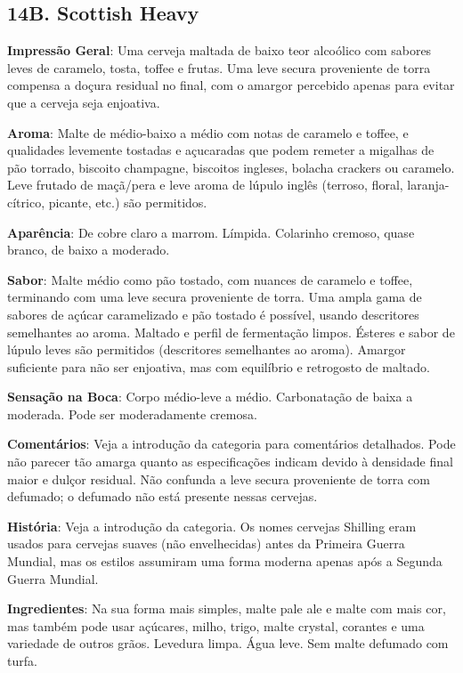 \subsection*{14B. Scottish Heavy}
\textbf{Impressão Geral}: Uma cerveja maltada de baixo teor alcoólico com sabores leves de caramelo, tosta, toffee e frutas. Uma leve secura proveniente de torra compensa a doçura residual no final, com o amargor percebido apenas para evitar que a cerveja seja enjoativa.

\textbf{Aroma}: Malte de médio-baixo a médio com notas de caramelo e toffee, e qualidades levemente tostadas e açucaradas que podem remeter a migalhas de pão torrado, biscoito champagne, biscoitos ingleses, bolacha crackers ou caramelo. Leve frutado de maçã/pera e leve aroma de lúpulo inglês (terroso, floral, laranja-cítrico, picante, etc.) são permitidos.

\textbf{Aparência}: De cobre claro a marrom. Límpida. Colarinho cremoso, quase branco, de baixo a moderado.

\textbf{Sabor}: Malte médio como pão tostado, com nuances de caramelo e toffee, terminando com uma leve secura proveniente de torra. Uma ampla gama de sabores de açúcar caramelizado e pão tostado é possível, usando descritores semelhantes ao aroma. Maltado e perfil de fermentação limpos. Ésteres e sabor de lúpulo leves são permitidos (descritores semelhantes ao aroma). Amargor suficiente para não ser enjoativa, mas com equilíbrio e retrogosto de maltado.

\textbf{Sensação na Boca}: Corpo médio-leve a médio. Carbonatação de baixa a moderada. Pode ser moderadamente cremosa.

\textbf{Comentários}: Veja a introdução da categoria para comentários detalhados. Pode não parecer tão amarga quanto as especificações indicam devido à densidade final maior e dulçor residual. Não confunda  a leve secura proveniente de torra com defumado; o defumado não está presente nessas cervejas.

\textbf{História}: Veja a introdução da categoria. Os nomes cervejas Shilling eram usados para cervejas suaves (não envelhecidas) antes da Primeira Guerra Mundial, mas os estilos assumiram uma forma moderna apenas após a Segunda Guerra Mundial.

\textbf{Ingredientes}: Na sua forma mais simples, malte pale ale e malte com mais cor, mas também pode usar açúcares, milho, trigo, malte crystal, corantes e uma variedade de outros grãos. Levedura limpa. Água leve. Sem malte defumado com turfa.

